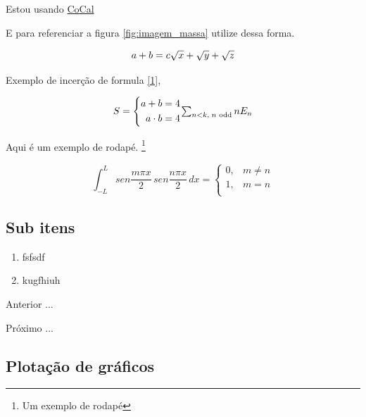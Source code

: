 \par Estou usando \href {https://cocalc.com/} {CoCal}

E para referenciar a figura \ref{fig:imagem_massa} utilize dessa forma.

\begin{equation}
  a + b = c \label{1}
  $$ $$ %
  \sqrt{x} + \sqrt{\smash[b]{y}} + \sqrt{z}
\end{equation}


\par Exemplo de incerção de formula \eqref{1},

\begin{equation}
S = \left\{
\begin{aligned}
  a + b     &= 4\\
  a \cdot b &= 4
\end{aligned}
\right.
$$ $$%
\sum_{n<k,\;\text{$n$ odd}} nE_n
 \label{3}
\end{equation}

Aqui é um exemplo de rodapé. \footnote{Um exemplo de rodapé}

\begin{equation}
\int_{-L}^{L} sen \frac{m \pi x}{2}\,sen \frac{n \pi x}{2}\,dx =
\left \{
\begin{array}{cc}
0, & m \neq n \\
1, & m = n \\
\end{array}
\right.
\end{equation}


\subsection{Sub itens}

\begin{enumerate}[label=\Roman{*}, ref=(\roman{*})]
  \item fsfsdf
  \item kugfhiuh
\end{enumerate}

\begin{asparaenum}
\item Anterior ... \cite{ninguem2022curioso}
\item Próximo ... \label{pl1}
\end{asparaenum}

\subsection{Plotação de gráficos}

